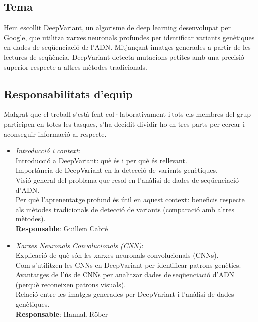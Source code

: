 \documentclass[a4paper]{article}
\begin{document}
\begin{table}[ht]
	\subsection{Tema}
	Hem escollit DeepVariant, un algorisme de deep learning desenvolupat per Google, que utilitza xarxes neuronals profundes per identificar variants genètiques en dades de seqüenciació de l'ADN. Mitjançant imatges generades a partir de les lectures de seqüència, DeepVariant detecta mutacions petites amb una precisió superior respecte a altres mètodes tradicionals.
	
	\subsection{Responsabilitats d'equip}
		Malgrat que el treball s'està fent col·laborativament i tots els membres del grup participen en totes les tasques, s'ha decidit dividir-ho en tres parts per cercar i aconseguir informació al respecte.
	\begin{itemize}
		\item \emph{Introducció i context}:\\
			Introducció a DeepVariant: què és i per què és rellevant.\\
			Importància de DeepVariant en la detecció de variants genètiques.\\
			Visió general del problema que resol en l'anàlisi de dades de seqüenciació d'ADN.\\
			Per què l'aprenentatge profund és útil en aquest context: beneficis respecte als mètodes tradicionals de detecció de variants (comparació amb altres mètodes).\\
			\textbf{Responsable}: Guillem Cabré\\
			
		\item \emph{Xarxes Neuronals Convolucionals (CNN)}:\\
			Explicació de què són les xarxes neuronals convolucionals (CNNs).\\
			Com s'utilitzen les CNNs en DeepVariant per identificar patrons genètics.\\
			Avantatges de l'ús de CNNs per analitzar dades de seqüenciació d'ADN (perquè reconeixen patrons visuals).\\
			Relació entre les imatges generades per DeepVariant i l'anàlisi de dades genètiques.\\
			\textbf{Responsable}: Hannah Röber\\
			

\end{itemize}
\end{table}
\end{document}
